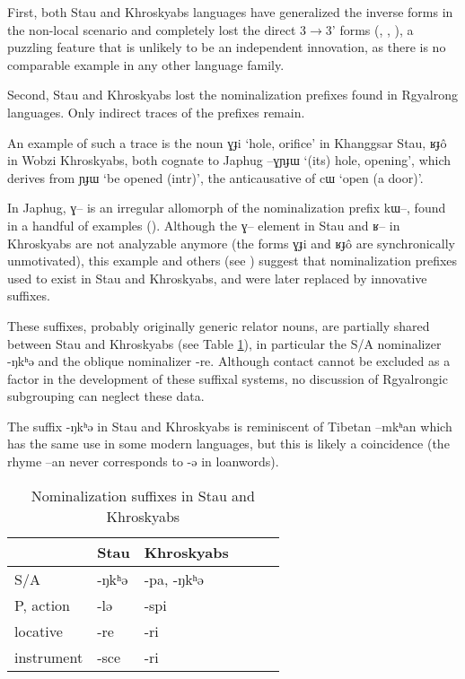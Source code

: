 \documentclass[oneside,a4paper,11pt]{article}
\newcommand{\ipa}[1]{{\phon #1}} %
\begin{document}
 First, both Stau and Khroskyabs languages have generalized the inverse forms in the non-local scenario and completely lost the direct 3$\rightarrow$3' forms (\citealt{lai13affixale}, \citealt{jacques14inverse},   \citealt{lai14person}), a puzzling feature that is unlikely to be an independent innovation, as there is no comparable example in any other language family.
 
 Second, Stau and Khroskyabs lost the nominalization prefixes found in Rgyalrong languages. Only indirect traces of the prefixes remain.
 
 An example of such a trace is the noun \ipa{ɣɟi}  `hole, orifice' in Khanggsar Stau,  \ipa{ʁɟô} in Wobzi Khroskyabs, both   cognate to Japhug \ipa{--ɣɲɟɯ}  `(its) hole, opening', which  derives from \ipa{ɲɟɯ} `be opened (intr)', the anticausative of \ipa{cɯ} `open (a door)'. 
 
 In Japhug, \ipa{ɣ--} is an irregular allomorph of the nominalization prefix \ipa{kɯ--}, found in a handful of examples (\citealt[4-6]{jacques14antipassive}). Although the \ipa{ɣ--} element in Stau and \ipa{ʁ--} in Khroskyabs are not analyzable anymore (the forms \ipa{ɣɟi}  and   \ipa{ʁɟô} are synchronically unmotivated), this example and others (see \citealt[1228-9]{jacques12incorp}) suggest  that nominalization prefixes used to exist in Stau and Khroskyabs, and were later replaced by innovative suffixes.  
 
 These suffixes, probably originally generic relator nouns, are partially shared between Stau and Khroskyabs (see Table \ref{tab:nmlz}), in particular the S/A nominalizer \ipa{-ŋkʰə} and the oblique nominalizer \ipa{-re}. Although contact cannot be excluded as a factor in the development of these suffixal systems, no discussion of Rgyalrongic subgrouping can neglect these data. 
 
 The suffix \ipa{-ŋkʰə}  in Stau and Khroskyabs is reminiscent of Tibetan \ipa{--mkʰan} which has the same use in some modern languages, but this is likely a coincidence (the rhyme \ipa{--an} never corresponds to \ipa{-ə} in loanwords).
 
 
 
 
  \begin{table}[h]
  \caption{Nominalization suffixes in Stau and Khroskyabs} \label{tab:nmlz} \centering
 \begin{tabular}{llllll}
 \toprule
 &	Stau &	Khroskyabs &	\\	
 \midrule
S/A &	\ipa{-ŋkʰə} &	\ipa{-pa, -ŋkʰə} &	\\
P, action &	\ipa{-lə} &	\ipa{-spi} &	\\
locative &	\ipa{-re} &	\ipa{-ri} &	\\
instrument &	\ipa{-sce} &	\ipa{-ri} &	\\
\bottomrule
\end{tabular}
\end{table}
\end{document}
